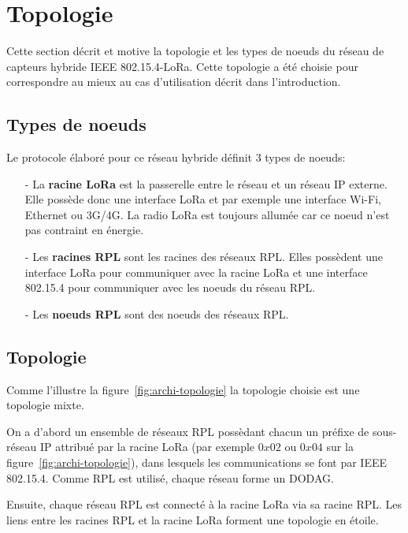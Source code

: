 \section{Topologie}\label{sec:archi-topologie}
\renewcommand{\rightmark}{Topologie}

Cette section décrit et motive la topologie et les types de noeuds du réseau de capteurs hybride IEEE 802.15.4-LoRa. Cette topologie a été choisie pour correspondre au mieux au cas d'utilisation décrit dans l'introduction.

\subsection*{Types de noeuds}
    Le protocole élaboré pour ce réseau hybride définit 3 types de noeuds:
    \begin{itemize}
        \item[-] La \textbf{racine LoRa} est la passerelle entre le réseau et un réseau IP externe. Elle possède donc une interface LoRa et par exemple une interface Wi-Fi, Ethernet ou 3G/4G.
        La radio LoRa est toujours allumée car ce noeud n'est pas contraint en énergie.  
        \item[-] Les \textbf{racines RPL} sont les racines des réseaux RPL. Elles possèdent une interface LoRa pour communiquer avec la racine LoRa et une interface 802.15.4 pour communiquer avec les noeuds du réseau RPL.
        \item[-] Les \textbf{noeuds RPL} sont des noeuds des réseaux RPL.
    \end{itemize}

\subsection*{Topologie}
Comme l'illustre la figure~\ref{fig:archi-topologie} la topologie choisie est une topologie mixte.

On a d'abord un ensemble de réseaux RPL possèdant chacun un préfixe de sous-réseau IP attribué par la racine LoRa (par exemple $0x02$ ou $0x04$ sur la figure~\ref{fig:archi-topologie}), dans lesquels les communications se font par IEEE 802.15.4.
Comme RPL est utilisé, chaque réseau forme un DODAG.

Ensuite, chaque réseau RPL est connecté à la racine LoRa via sa racine RPL. Les liens entre les racines RPL et la racine LoRa forment une topologie en étoile.


